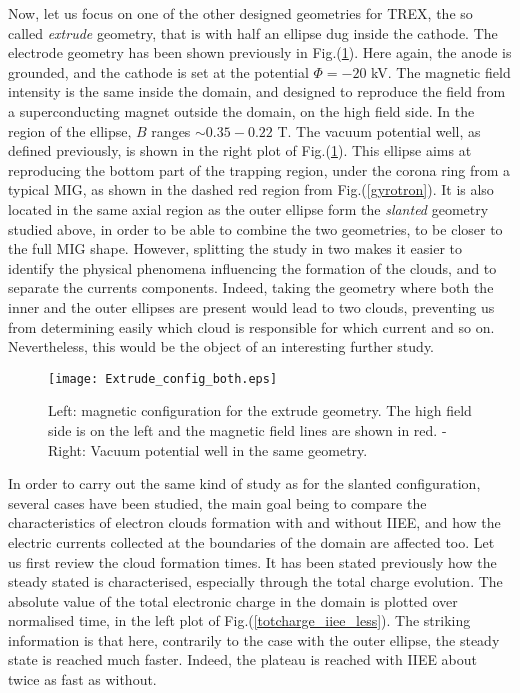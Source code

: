 Now, let us focus on one of the other designed geometries for TREX, the so called \emph{extrude} geometry, that is with half an ellipse dug inside the cathode. The electrode geometry has been shown previously in Fig.(\ref{extrude_config_both}). Here again, the anode is grounded, and the cathode is set at the potential $\Phi = -20$ kV. The magnetic field intensity is the same inside the domain, and designed to reproduce the field from a superconducting magnet outside the domain, on the high field side. In the region of the ellipse, $B$ ranges $\sim 0.35 - 0.22$ T. The vacuum potential well, as defined previously, is shown in the right plot of Fig.(\ref{extrude_config_both}). This ellipse aims at reproducing the bottom part of the trapping region, under the corona ring from a typical MIG, as shown in the dashed red region from Fig.(\ref{gyrotron}). It is also located in the same axial region as the outer ellipse form the \emph{slanted} geometry studied above, in order to be able to combine the two geometries, to be closer to the full MIG shape. However, splitting the study in two makes it easier to identify the physical phenomena influencing the formation of the clouds, and to separate the currents components. Indeed, taking the geometry where both the inner and the outer ellipses are present would lead to two clouds, preventing us from determining easily which cloud is responsible for which current and so on. Nevertheless, this would be the object of an interesting further study. \\


\begin{figure}[h!]
\centering
	\texttt{[image: Extrude\_config\_both.eps]}
	\caption{\label{extrude_config_both} Left: magnetic configuration for the extrude geometry. The high field side is on the left and the magnetic field lines are shown in red. - Right: Vacuum potential well in the same geometry.}
\end{figure}

In order to carry out the same kind of study as for the slanted configuration, several cases have been studied, the main goal being to compare the characteristics of electron clouds formation with and without IIEE, and how the electric currents collected at the boundaries of the domain are affected too. Let us first review the cloud formation times. It has been stated previously how the steady stated is characterised, especially through the total charge evolution. The absolute value of the total electronic charge in the domain is plotted over normalised time, in the left plot of Fig.(\ref{totcharge_iiee_less}). The striking information is that here, contrarily to the case with the outer ellipse, the steady state is reached much faster. Indeed, the plateau is reached with IIEE about twice as fast as without.\\

